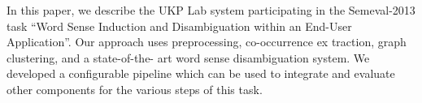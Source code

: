 In this paper, we describe the UKP Lab system participating in the Semeval-2013 task ``Word Sense Induction and Disambiguation within an End-User
 Application''. Our approach uses preprocessing, co-occurrence ex traction,
 graph clustering, and a state-of-the- art word sense disambiguation system. We
 developed a configurable pipeline which can be used to integrate and evaluate
 other components for the various steps of this task.

